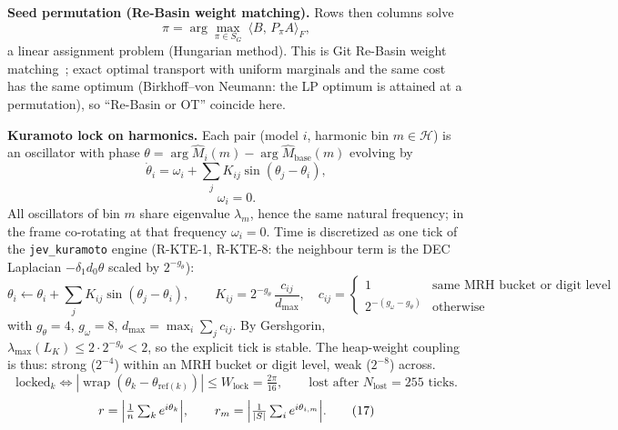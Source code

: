 \documentclass[11pt]{article}
\newcommand{\wrap}{\operatorname{wrap}}
\begin{document}
\textbf{Seed permutation (Re-Basin weight matching).} Rows then columns solve
\begin{equation}\pi=\arg\max_{\pi\in S_G}\ \langle B,\,P_\pi A\rangle_F ,\tag{13}\end{equation}
a linear assignment problem (Hungarian method). This is Git Re-Basin weight matching~\cite{rebasin}; exact optimal transport with uniform marginals and the same cost has the same optimum (Birkhoff--von Neumann: the LP optimum is attained at a permutation), so ``Re-Basin or OT'' coincide here.

\textbf{Kuramoto lock on harmonics.} Each pair (model $i$, harmonic bin $m\in\mathcal H$) is an oscillator with phase $\theta=\arg\widehat M_i(m)-\arg\widehat M_{\mathrm{base}}(m)$ evolving by
\begin{equation}\dot\theta_i=\omega_i+\sum_j K_{ij}\sin(\theta_j-\theta_i),\tag{14}\end{equation}
\begin{equation}\omega_i=0 .\tag{14b}\end{equation}
All oscillators of bin $m$ share eigenvalue $\lambda_m$, hence the same natural frequency; in the frame co-rotating at that frequency $\omega_i=0$. Time is discretized as one tick of the \texttt{jev\_kuramoto} engine (R-KTE-1, R-KTE-8: the neighbour term is the DEC Laplacian $-\delta_1 d_0\theta$ scaled by $2^{-g_\theta}$):
\begin{equation}\theta_i\leftarrow\theta_i+\sum_jK_{ij}\sin(\theta_j-\theta_i),\qquad K_{ij}=2^{-g_\theta}\,\frac{c_{ij}}{d_{\max}},\quad c_{ij}=\begin{cases}1&\text{same MRH bucket or digit level}\\2^{-(g_\omega-g_\theta)}&\text{otherwise}\end{cases}\tag{15}\end{equation}
with $g_\theta=4$, $g_\omega=8$, $d_{\max}=\max_i\sum_jc_{ij}$. By Gershgorin, $\lambda_{\max}(L_K)\le2\cdot2^{-g_\theta}<2$, so the explicit tick is stable. The heap-weight coupling is thus: strong ($2^{-4}$) within an MRH bucket or digit level, weak ($2^{-8}$) across.
\begin{equation}\text{locked}_k\iff|\wrap(\theta_k-\theta_{\mathrm{ref}(k)})|\le W_{\mathrm{lock}}=\tfrac{2\pi}{16},\qquad \text{lost after }N_{\mathrm{lost}}=255\text{ ticks}.\tag{16}\end{equation}
\begin{equation}r=\Bigl|\tfrac1n\textstyle\sum_k e^{i\theta_k}\Bigr|,\qquad r_m=\Bigl|\tfrac{1}{|S|}\textstyle\sum_{i}e^{i\theta_{i,m}}\Bigr| .\tag{17}\end{equation}
\end{document}

